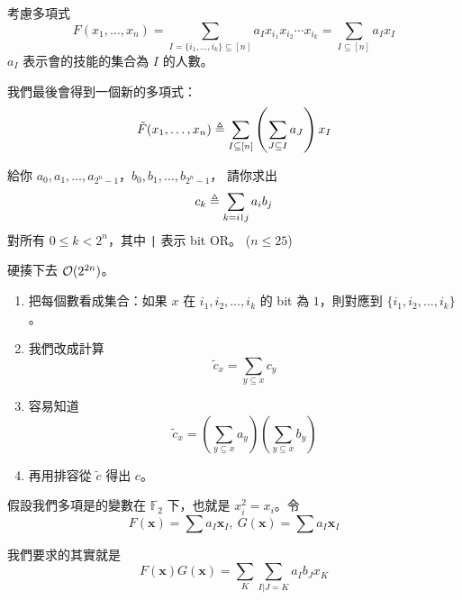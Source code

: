 \documentclass[standalone]{beamer}
\begin{document}
\begin{frame}{}
  考慮多項式
  \[ F(x_1, \dots, x_n) = \sum_{I = \{i_1, \dots, i_k\} \subseteq [n]} a_I x_{i_1} x_{i_2} \cdots x_{i_k}
  = \sum_{I \subseteq [n]} a_I x_I \]
  $a_I$ 表示會的技能的集合為 $I$ 的人數。

  我們最後會得到一個新的多項式：
  \[ \tilde{F}(x_1, \dots, x_n) \triangleq \sum_{I \subseteq [n]} \left( \sum_{J \subseteq I} a_J \right) x_I \]
\end{frame}


\begin{frame}{}
  \begin{problem}
    給你 $a_0, a_1, \dots, a_{2^n-1}$，$b_0, b_1, \dots, b_{2^n-1}$，
    請你求出
    \[ c_k \triangleq \sum_{k = i \texttt{|} j} a_i b_j \]
    對所有 $0 \leq k < 2^n$，其中 \texttt{|} 表示 bit OR。 ($n \leq 25$)
  \end{problem}
  硬揍下去 $\mathcal{O}(2^{2n})$。
\end{frame}

\begin{frame}{}
  \begin{enumerate}[<+->]
    \item 把每個數看成集合：如果 $x$ 在 $i_1, i_2, \dots, i_k$ 的 bit 為 $1$，則對應到
      $\{i_1, i_2, \dots, i_k\}$。
    \item 我們改成計算
      \[ \tilde{c}_x = \sum_{y \subseteq x} c_y \]
    \item 容易知道
      \[ \tilde{c}_x = \left(\sum_{y \subseteq x} a_y\right) \left(\sum_{y \subseteq x} b_y\right)\]
    \item 再用排容從 $\tilde{c}$ 得出 $c$。
  \end{enumerate}
\end{frame}

\begin{frame}{}
  假設我們多項是的變數在 $\mathbb{F}_2$ 下，也就是 $x_i^2 = x_i$。令
    \[ F(\bm{x}) = \sum a_I \bm{x}_I,\ G(\bm{x}) = \sum a_I \bm{x}_I \]
  \pause

  我們要求的其實就是
  \[ F(\bm{x}) G(\bm{x}) = \sum_K \sum_{I \texttt{|} J = K} a_I b_J x_K \]
\end{frame}
\end{document}
